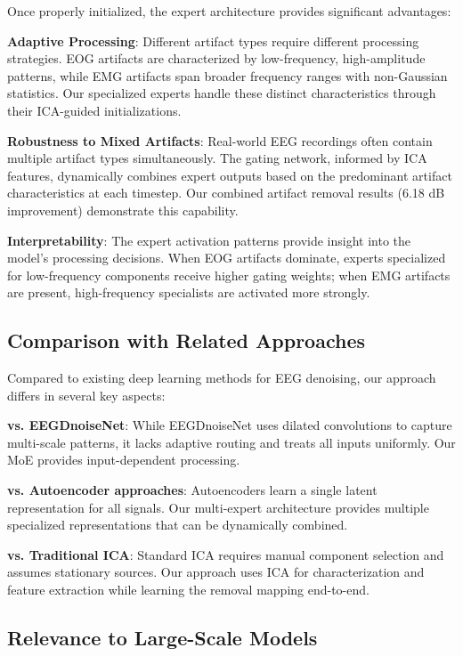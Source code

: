 \documentclass{article}
\begin{document}
Once properly initialized, the expert architecture provides significant advantages:

\textbf{Adaptive Processing}: Different artifact types require different processing strategies. EOG artifacts are characterized by low-frequency, high-amplitude patterns, while EMG artifacts span broader frequency ranges with non-Gaussian statistics. Our specialized experts handle these distinct characteristics through their ICA-guided initializations.

\textbf{Robustness to Mixed Artifacts}: Real-world EEG recordings often contain multiple artifact types simultaneously. The gating network, informed by ICA features, dynamically combines expert outputs based on the predominant artifact characteristics at each timestep. Our combined artifact removal results (6.18 dB improvement) demonstrate this capability.

\textbf{Interpretability}: The expert activation patterns provide insight into the model's processing decisions. When EOG artifacts dominate, experts specialized for low-frequency components receive higher gating weights; when EMG artifacts are present, high-frequency specialists are activated more strongly.

\subsection{Comparison with Related Approaches}

Compared to existing deep learning methods for EEG denoising, our approach differs in several key aspects:

\textbf{vs. EEGDnoiseNet}: While EEGDnoiseNet uses dilated convolutions to capture multi-scale patterns, it lacks adaptive routing and treats all inputs uniformly. Our MoE provides input-dependent processing.

\textbf{vs. Autoencoder approaches}: Autoencoders learn a single latent representation for all signals. Our multi-expert architecture provides multiple specialized representations that can be dynamically combined.

\textbf{vs. Traditional ICA}: Standard ICA requires manual component selection and assumes stationary sources. Our approach uses ICA for characterization and feature extraction while learning the removal mapping end-to-end.

\subsection{Relevance to Large-Scale Models}
\end{document}
